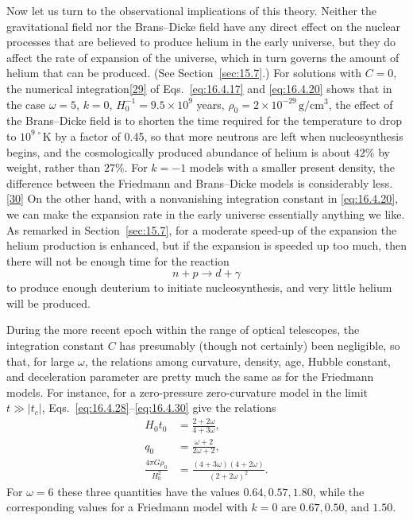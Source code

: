 Now let us turn to the observational implications of this theory. Neither the
gravitational field nor the Brans--Dicke field have any direct effect on the
nuclear processes that are believed to produce helium in the early universe,
but they do affect the rate of expansion of the universe, which in turn governs
the amount of helium that can be produced. (See Section~\ref{sec:15.7}.) For
solutions with \(C=0\), the numerical
integration\hyperref[ch16-ref-29]{[29]} of Eqs.~\eqref{eq:16.4.17} and
\eqref{eq:16.4.20} shows that in the case
\(\omega=5\), \(k=0\), \(H_0^{-1}=9.5\times10^9\) years,
\(\rho_0=2\times10^{-29}\,\mathrm{g/cm^3}\), the effect of the Brans--Dicke
field is to shorten the time required for the temperature to drop to
\(10^{9\,\circ}\mathrm K\) by a factor of 0.45, so that more neutrons are left
when nucleosynthesis begins, and the cosmologically produced abundance of
helium is about \(42\%\) by weight, rather than \(27\%\). For \(k=-1\) models
with a smaller present density, the difference between the Friedmann and
Brans--Dicke models is considerably less.\hyperref[ch16-ref-30]{[30]} On the
other hand, with a nonvanishing integration constant in \eqref{eq:16.4.20},
we can make the expansion rate in the early universe essentially anything we
like. As remarked in Section~\ref{sec:15.7}, for a moderate speed-up of the
expansion the helium production is enhanced, but if the expansion is speeded
up too much, then there will not be enough time for the reaction
\[
  n+p\longrightarrow d+\gamma
\]
to produce enough deuterium to initiate nucleosynthesis, and very little
helium will be produced.

During the more recent epoch within the range of optical telescopes, the
integration constant \(C\) has presumably (though not certainly) been
negligible, so that, for large \(\omega\), the relations among curvature,
density, age, Hubble constant, and deceleration parameter are pretty much the
same as for the Friedmann models. For instance, for a zero-pressure
zero-curvature model in the limit \(t\gg\lvert t_c\rvert\),
Eqs.~\eqref{eq:16.4.28}--\eqref{eq:16.4.30} give the relations
\begin{align}
  H_0t_0
  &=
  \frac{2+2\omega}{4+3\omega},
  \tag{16.4.38}\label{eq:16.4.38}\\
  q_0
  &=
  \frac{\omega+2}{2\omega+2},
  \tag{16.4.39}\label{eq:16.4.39}\\
  \frac{4\pi G\rho_0}{H_0^2}
  &=
  \frac{(4+3\omega)(4+2\omega)}{(2+2\omega)^2}.
  \tag{16.4.40}\label{eq:16.4.40}
\end{align}
For \(\omega=6\) these three quantities have the values \(0.64,0.57,1.80\),
while the corresponding values for a Friedmann model with \(k=0\) are
\(0.67,0.50\), and \(1.50\).

